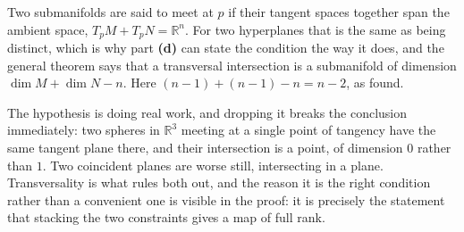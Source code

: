 \begin{exercisesolution}
\begin{remark}
Two submanifolds are said to meet  at $p$ if their tangent spaces together
span the ambient space, $T_pM + T_pN = \mathbb{R}^n$. For two hyperplanes that is the same as
being distinct, which is why part \textbf{(d)} can state the condition the way it does, and the
general theorem says that a transversal intersection is a submanifold of dimension
$\dim M + \dim N - n$. Here $(n-1)+(n-1)-n = n-2$, as found.

The hypothesis is doing real work, and dropping it breaks the conclusion immediately: two spheres
in $\mathbb{R}^3$ meeting at a single point of tangency have the same tangent plane there, and
their intersection is a point, of dimension $0$ rather than $1$. Two coincident planes are worse
still, intersecting in a plane. Transversality is what rules both out, and the reason it is the
right condition rather than a convenient one is visible in the proof: it is precisely the
statement that stacking the two constraints gives a map of full rank.
\end{remark}
\end{exercisesolution}

